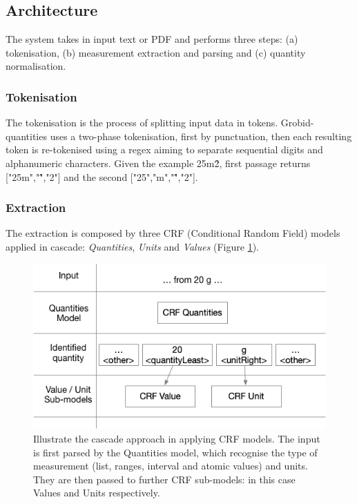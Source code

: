 \documentclass[sigplan, anonymous, review]{acmart}
\begin{document}
\subsection{Architecture}
The system takes in input text or PDF and performs three steps: (a) tokenisation, (b) measurement extraction and parsing and (c) quantity normalisation. 

\subsubsection{Tokenisation}
The tokenisation is the process of splitting input data in tokens. Grobid-quantities uses a two-phase tokenisation, first by punctuation, then each resulting token is re-tokenised using a regex aiming to separate sequential digits and alphanumeric characters. Given the example 25m\^2, first passage returns ["25m","\^","2"] and the second ["25","m","\^","2"]. 

\subsubsection{Extraction}
The extraction is composed by three CRF (Conditional Random Field) models applied in cascade: \textit{Quantities}, \textit{Units} and \textit{Values} (Figure \ref{fig:schema-cascade}). 

\begin{figure}[ht]
  \centering
  \includegraphics[width=\linewidth]{images/schema-cascade}
  \caption{Illustrate the cascade approach in applying CRF models. The input is first parsed by the Quantities model, which recognise the type of measurement (list, ranges, interval and atomic values) and units. They are then passed to further CRF sub-models: in this case Values and Units respectively.}
  \label{fig:schema-cascade}
\end{figure}
\end{document}
